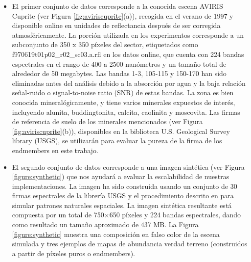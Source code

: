 \begin{itemize}
    \item El primer conjunto de datos corresponde a la conocida escena AVIRIS Cuprite (ver Figura \ref{fig:aviriscuprite}(a)), recogida en el verano de 1997 y disponible online en unidades de reflectancia después de ser corregida atmosféricamente. La porción utilizada en los experimentos corresponde a un subconjunto de 350 x 350 píxeles del sector, etiquetados como f970619t01p02\_r02\_sc03.a.rfl en los datos online, que cuenta con 224 bandas espectrales en el rango de 400 a 2500 nanómetros y un tamaño total de alrededor de 50 megabytes. Las bandas 1-3, 105-115 y 150-170 han sido eliminadas antes del análisis debido a la absorción por agua y la baja relación señal-ruido o signal-to-noise ratio (SNR) de estas bandas. La zona es bien conocida mineralógicamente, y tiene varios minerales expuestos de interés, incluyendo alunita, buddingtonita, calcita, caolinita y moscovita. Las firmas de referencia de suelo de los minerales mencionados (ver Figura \ref{fig:aviriscuprite}(b)), disponibles en la biblioteca U.S. Geological Survey library (USGS), se utilizarán para evaluar la pureza de la firma de los endmembers en este trabajo.
    
    \item El segundo conjunto de datos corresponde a una imagen sintética (ver Figura \ref{figure:synthetic}) que nos ayudará a evaluar la escalabilidad de nuestras implementaciones. La imagen ha sido construida usando un conjunto de 30 firmas espectrales de la librería USGS y el procedimiento descrito en \cite{miller1986definition} para simular patrones naturales espaciales. La imagen sintética resultante está compuesta por un total de 750$\times$650 píxeles y 224 bandas espectrales, dando como resultado un tamaño aproximado de 437 MB. La Figura \ref{figure:synthetic} muestra una composición en falso color de la escena simulada y tres ejemplos de mapas de abundancia verdad terreno (construidos a partir de píxeles puros o endmembers).
    
\end{itemize}

